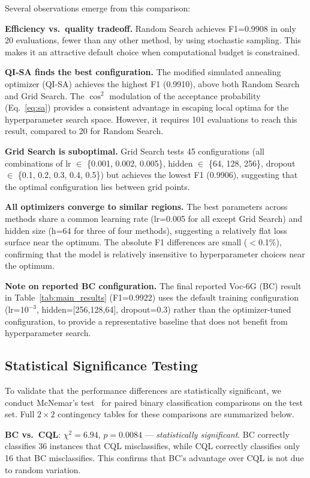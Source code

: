 \documentclass[10pt,letterpaper]{article}
\begin{document}
Several observations emerge from this comparison:

\textbf{Efficiency vs.\ quality tradeoff.} Random Search achieves F1=0.9908 in only 20 evaluations, fewer than any other method, by using stochastic sampling. This makes it an attractive default choice when computational budget is constrained.

\textbf{QI-SA finds the best configuration.} The modified simulated annealing optimizer (QI-SA) achieves the highest F1 (0.9910), above both Random Search and Grid Search. The $\cos^2$ modulation of the acceptance probability (Eq.~\ref{eq:sa}) provides a consistent advantage in escaping local optima for the hyperparameter search space. However, it requires 101 evaluations to reach this result, compared to 20 for Random Search.

\textbf{Grid Search is suboptimal.} Grid Search tests 45 configurations (all combinations of lr $\in$ \{0.001, 0.002, 0.005\}, hidden $\in$ \{64, 128, 256\}, dropout $\in$ \{0.1, 0.2, 0.3, 0.4, 0.5\}) but achieves the lowest F1 (0.9906), suggesting that the optimal configuration lies between grid points.

\textbf{All optimizers converge to similar regions.} The best parameters across methods share a common learning rate (lr=0.005 for all except Grid Search) and hidden size (h=64 for three of four methods), suggesting a relatively flat loss surface near the optimum. The absolute F1 differences are small ($<$0.1\%), confirming that the model is relatively insensitive to hyperparameter choices near the optimum.

\textbf{Note on reported BC configuration.} The final reported Voc-6G (BC) result in Table~\ref{tab:main_results} (F1=0.9922) uses the default training configuration (lr=$10^{-3}$, hidden=[256,128,64], dropout=0.3) rather than the optimizer-tuned configuration, to provide a representative baseline that does not benefit from hyperparameter search.

\subsection*{Statistical Significance Testing}

To validate that the performance differences are statistically significant, we conduct McNemar's test~\cite{mcnemar1947note} for paired binary classification comparisons on the test set. Full $2 \times 2$ contingency tables for these comparisons are summarized below.

\textbf{BC vs.\ CQL}: $\chi^2 = 6.94$, $p = 0.0084$ --- \emph{statistically significant}. BC correctly classifies 36 instances that CQL misclassifies, while CQL correctly classifies only 16 that BC misclassifies. This confirms that BC's advantage over CQL is not due to random variation.
\end{document}
